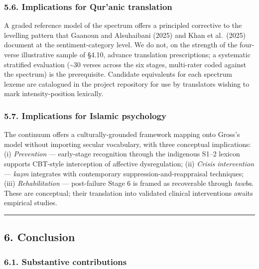 \documentclass[11pt,a4paper]{article}
\begin{document}
\subsubsection{5.6. Implications for Qur'anic
translation}\label{implications-for-quranic-translation}

A graded reference model of the spectrum offers a principled corrective
to the levelling pattern that Gaanoun and Alsuhaibani (2025) and Khan et
al.~(2025) document at the sentiment-category level. We do not, on the
strength of the four-verse illustrative sample of §4.10, advance
translation prescriptions; a systematic stratified evaluation
(\textasciitilde30 verses across the six stages, multi-rater coded
against the spectrum) is the prerequisite. Candidate equivalents for
each spectrum lexeme are catalogued in the project repository for use by
translators wishing to mark intensity-position lexically.

\subsubsection{5.7. Implications for Islamic
psychology}\label{implications-for-islamic-psychology}

The continuum offers a culturally-grounded framework mapping onto
Gross's model without importing secular vocabulary, with three
conceptual implications: (i) \emph{Prevention} --- early-stage
recognition through the indigenous S1--2 lexicon supports CBT-style
interception of affective dysregulation; (ii) \emph{Crisis intervention}
--- \emph{kaẓm} integrates with contemporary suppression-and-reappraisal
techniques; (iii) \emph{Rehabilitation} --- post-failure Stage 6 is
framed as recoverable through \emph{tawba}. These are conceptual; their
translation into validated clinical interventions awaits empirical
studies.

\begin{center}\rule{0.5\linewidth}{0.5pt}\end{center}

\subsection{6. Conclusion}\label{conclusion}

\subsubsection{6.1. Substantive
contributions}\label{substantive-contributions}
\end{document}
